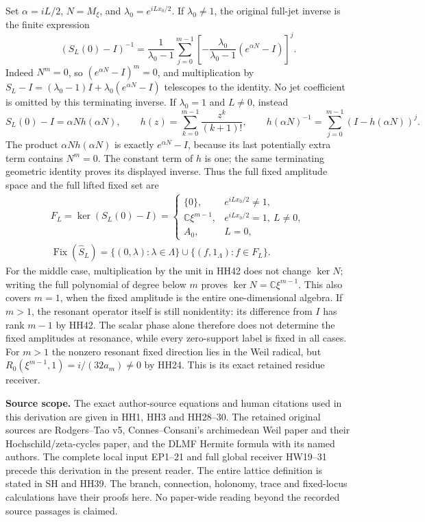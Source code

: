 \documentclass[11pt,a4paper]{article}
\theoremstyle{definition}\newtheorem{definition}[theorem]{Definition}
\begin{document}
Set $\alpha=iL/2$, $N=M_\xi$, and
$\lambda_0=e^{iLx_0/2}$. If $\lambda_0\ne1$, the original
full-jet inverse is the finite expression
\[
 (S_L(0)-I)^{-1}
  =\frac1{\lambda_0-1}
      \sum_{j=0}^{m-1}
       \left[-\frac{\lambda_0}{\lambda_0-1}
                         (e^{\alpha N}-I)\right]^j .
 \tag{HH41}\label{hh:fixed-inverse}
\]
Indeed $N^m=0$, so $(e^{\alpha N}-I)^m=0$, and multiplication
by $S_L-I=(\lambda_0-1)I+\lambda_0(e^{\alpha N}-I)$
telescopes to the identity. No jet coefficient is omitted by
this terminating inverse. If $\lambda_0=1$ and $L\ne0$, instead
\[
 S_L(0)-I=\alpha N h(\alpha N),\qquad
 h(z)=\sum_{k=0}^{m-1}\frac{z^k}{(k+1)!},\qquad
 h(\alpha N)^{-1}
      =\sum_{j=0}^{m-1}(I-h(\alpha N))^j .
 \tag{HH42}\label{hh:fixed-resonance}
\]
The product $\alpha Nh(\alpha N)$ is exactly $e^{\alpha N}-I$,
because its last potentially extra term contains $N^m=0$.
The constant term of $h$ is one; the same terminating geometric
identity proves its displayed inverse. Thus the full fixed
amplitude space and the full lifted fixed set are
\[
 \begin{gathered}
 F_L=\ker(S_L(0)-I)=
 \begin{cases}
   \{0\},&e^{iLx_0/2}\ne1,\\
   \mathbb C\xi^{m-1},&e^{iLx_0/2}=1,\ L\ne0,\\
   A_0,&L=0,
  \end{cases}\\[5pt]
 \operatorname{Fix}(\widehat S_L)=
 \{(0,\lambda):\lambda\in\Lambda\}
       \cup\{(f,1_\Lambda):f\in F_L\}.
 \end{gathered}
 \tag{HH43}\label{hh:fixed-locus}
\]
For the middle case, multiplication by the unit in HH42 does
not change $\ker N$; writing the full polynomial of degree below
$m$ proves $\ker N=\mathbb C\xi^{m-1}$. This also covers $m=1$,
when the fixed amplitude is the entire one-dimensional algebra.
If $m>1$, the resonant operator itself is still nonidentity:
its difference from $I$ has rank $m-1$ by HH42. The scalar phase
alone therefore does not determine the fixed amplitudes at
resonance, while every zero-support label is fixed in all cases.
For $m>1$ the nonzero resonant fixed direction lies in the Weil
radical, but
$R_0(\xi^{m-1},1)=i/(32a_m)\ne0$ by HH24.
This is its exact retained residue receiver.


\par\medskip\noindent\textbf{Source scope.}
The exact author-source equations and human citations used in this
derivation are given in HH1, HH3 and HH28--30. The retained original
sources are Rodgers--Tao v5, Connes--Consani's archimedean Weil paper
and their Hochschild/zeta-cycles paper, and the DLMF Hermite formula
with its named authors. The complete local input EP1--21 and full
global receiver HW19--31 precede this derivation in the present
reader. The entire lattice definition is stated in SH and HH39.
The branch, connection, holonomy, trace and fixed-locus calculations
have their proofs here. No paper-wide reading beyond the recorded
source passages is claimed.
\end{document}
